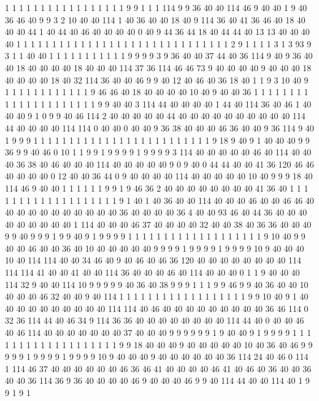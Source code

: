 1 1 1 1 1 1 1 1 1 1 1 1 1 1 1 1 1 9 9 1
1 1 114 9 9 36 40 40 114 46 9 40 40 1 9 40 36 46 40 9
9 3 2 10 40 40 114 1 40 36 40 40 18 40 9 114 36 40 41 36
46 40 18 40 40 40 44 1 40 44 40 46 40 40 40 40 0 40 9 44
36 44 18 40 44 44 40 13 13 40 40 40 40 1 1 1 1 1 1 1
1 1 1 1 1 1 1 1 1 1 1 1 1 1 1 1 1 1 1 1
1 1 1 2 9 1 1 1 1 3 1 3 93 9 3 1 1 40 40 1
1 1 1 1 1 1 1 1 1 1 9 9 9 9 3 9 36 40 40 37
44 40 36 114 9 40 9 36 40 40 18 40 40 40 40 18 40 40 40 114
37 36 114 46 46 73 9 40 40 40 40 9 40 40 40 18 40 40 40 40
18 40 32 114 36 40 40 46 9 9 40 12 40 46 40 36 18 40 1 1
9 3 10 40 9 1 1 1 1 1 1 1 1 1 1 1 1 9 46 46
40 18 40 40 40 40 10 40 9 40 40 36 1 1 1 1 1 1 1 1
1 1 1 1 1 1 1 1 1 1 1 1 1 9 9 40 40 3 114 44
40 40 40 40 1 44 40 114 36 40 46 1 40 40 40 9 1 0 9 9
40 46 114 2 40 40 40 40 40 44 40 40 40 40 40 40 40 40 40 40
114 44 40 40 40 40 114 114 0 40 40 0 40 40 9 36 38 40 40 40
46 36 40 40 9 36 114 9 40 1 9 9 9 1 1 1 1 1 1 1
1 1 1 1 1 1 1 1 1 1 1 1 1 1 1 1 1 1 9 18
9 40 9 1 40 40 40 9 9 36 9 9 40 46 0 10 1 1 9 9
1 9 9 9 9 1 9 9 9 9 3 114 40 40 40 40 40 46 40 114
40 40 40 36 38 40 46 40 40 40 114 40 40 40 40 40 9 0 9 40
0 44 44 40 40 41 36 120 46 46 40 40 40 40 0 12 40 40 36 44
0 9 40 40 40 40 114 40 40 40 40 40 10 40 9 9 9 18 40 114
46 9 40 40 1 1 1 1 1 1 9 9 1 9 46 36 2 40 40 40
40 40 40 40 40 41 36 40 1 1 1 1 1 1 1 1 1 1 1 1
1 1 1 1 1 1 1 9 1 40 1 40 36 40 40 114 40 40 40 46
40 40 46 46 40 40 40 40 40 40 40 40 40 40 40 36 40 40 40 40
36 4 40 40 93 46 40 44 36 40 40 40 40 40 40 40 40 40 1 114
40 40 40 46 37 40 40 40 40 32 40 40 38 40 36 36 40 40 40 9
9 40 9 9 9 1 9 9 40 9 1 9 9 9 9 1 1 1 1 1
1 1 1 1 1 1 1 1 1 1 1 1 1 1 9 10 40 9 9 40
40 46 40 40 36 40 10 40 40 40 40 40 9 9 9 9 1 9 9 9
9 1 9 9 9 9 10 9 40 40 40 10 40 114 114 40 40 34 46 40
9 40 46 40 46 36 120 40 40 40 40 40 40 40 40 114 114 114 41 40
40 41 40 40 114 36 40 40 40 46 40 114 40 40 40 0 1 1 9 40
40 40 114 32 9 40 40 114 10 9 9 9 9 9 40 36 40 38 9 9
9 1 1 1 9 9 46 9 9 40 36 40 40 10 40 40 40 46 32 40
40 9 40 114 1 1 1 1 1 1 1 1 1 1 1 1 1 1 1 1
1 1 9 9 10 40 9 1 40 40 40 40 40 40 40 40 40 40 114 114
40 46 40 40 40 40 40 40 40 40 40 36 46 114 0 32 36 114 44 40
46 34 9 114 36 36 40 40 40 40 40 40 40 40 114 44 40 0 40 40
46 40 46 114 40 40 40 40 40 40 40 37 40 40 40 9 9 9 9 9
9 1 9 40 40 9 1 9 9 9 9 1 1 1 1 1 1 1 1 1
1 1 1 1 1 1 1 1 1 1 9 9 18 40 40 40 9 40 40 40
40 40 10 40 36 40 46 9 9 9 9 9 1 9 9 9 9 1 9 9
9 9 10 9 40 40 40 9 40 40 40 40 40 40 36 114 24 40 46 0
114 1 114 46 37 40 40 40 40 40 40 46 36 46 41 40 40 40 40 46
41 40 46 40 36 40 40 36 40 40 36 114 36 9 36 40 40 40 40 46
9 40 40 40 46 9 9 40 114 44 40 40 114 40 1 9 9 1 9 1

